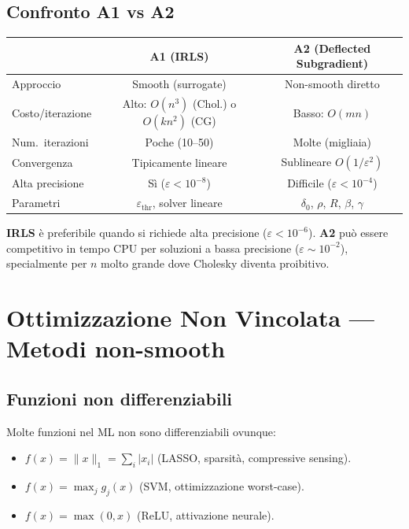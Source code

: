 \documentclass[11pt, a4paper, twoside]{book}
\theoremstyle{definition}
\theoremstyle{plain}
\theoremstyle{remark}
\begin{document}
\section{Confronto A1 vs A2}
\label{sec:confronto-algos}

\begin{center}
\renewcommand{\arraystretch}{1.3}
\begin{tabular}{lcc}
\hline
 & \textbf{A1 (IRLS)} & \textbf{A2 (Deflected Subgradient)} \\
\hline
Approccio & Smooth (surrogate) & Non-smooth diretto \\
Costo/iterazione & Alto: $O(n^3)$ (Chol.) o $O(kn^2)$ (CG) & Basso: $O(mn)$ \\
Num.\ iterazioni & Poche (10–50) & Molte (migliaia) \\
Convergenza & Tipicamente lineare & Sublineare $O(1/\varepsilon^2)$ \\
Alta precisione & Sì ($\varepsilon < 10^{-8}$) & Difficile ($\varepsilon < 10^{-4}$) \\
Parametri & $\varepsilon_{\mathrm{thr}}$, solver lineare & $\delta_0$, $\rho$, $R$, $\beta$, $\gamma$ \\
\hline
\end{tabular}
\end{center}

\begin{keybox}
\textbf{IRLS} è preferibile quando si richiede alta precisione ($\varepsilon < 10^{-6}$). \textbf{A2}
può essere competitivo in tempo CPU per soluzioni a bassa precisione ($\varepsilon \sim 10^{-2}$),
specialmente per $n$ molto grande dove Cholesky diventa proibitivo.
\end{keybox}

\chapter{Ottimizzazione Non Vincolata — Metodi non-smooth}
\label{ch:nonsmooth}

\section{Funzioni non differenziabili}
\label{sec:nonsmooth-functions}

Molte funzioni nel ML non sono differenziabili ovunque:
\begin{itemize}
  \item $f(x) = \|x\|_1 = \sum_i |x_i|$ (LASSO, sparsità, compressive sensing).
  \item $f(x) = \max_j g_j(x)$ (SVM, ottimizzazione worst-case).
  \item $f(x) = \max(0, x)$ (ReLU, attivazione neurale).
\end{itemize}
\end{document}

